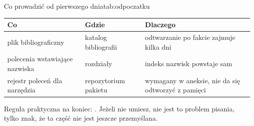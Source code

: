 \begin{tabelaepi}{Co prowadzić od pierwszego dnia}{tab:odpoczatku}
\begin{tabular}{@{}p{4.2cm}p{3.8cm}p{5.6cm}@{}}
\toprule
Co & Gdzie & Dlaczego \\
\midrule
plik bibliograficzny & katalog bibliografii & odtwarzanie po fakcie zajmuje kilka dni \\
polecenia wstawiające nazwiska & rozdziały & indeks nazwisk powstaje sam \\
rejestr poleceń dla narzędzia & repozytorium pakietu & wymagany w aneksie, nie da się odtworzyć z pamięci \\
\bottomrule
\end{tabular}
\end{tabelaepi}

Reguła praktyczna na koniec: . Jeżeli nie umiesz, nie jest to problem pisania, tylko znak, że ta część nie jest jeszcze przemyślana.

